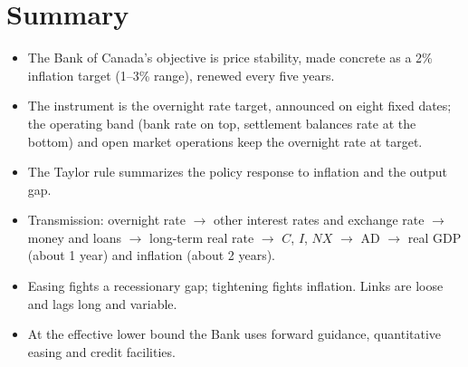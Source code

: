 \section{Summary}

\begin{itemize}
  \item The Bank of Canada's objective is price stability, made concrete as a 2\% inflation
        target (1--3\% range), renewed every five years.
  \item The instrument is the overnight rate target, announced on eight fixed dates; the
        operating band (bank rate on top, settlement balances rate at the bottom) and open
        market operations keep the overnight rate at target.
  \item The Taylor rule summarizes the policy response to inflation and the output gap.
  \item Transmission: overnight rate $\to$ other interest rates and exchange rate $\to$
        money and loans $\to$ long-term real rate $\to$ $C$, $I$, $NX$ $\to$ AD $\to$ real
        GDP (about 1 year) and inflation (about 2 years).
  \item Easing fights a recessionary gap; tightening fights inflation. Links are loose and
        lags long and variable.
  \item At the effective lower bound the Bank uses forward guidance, quantitative easing
        and credit facilities.
\end{itemize}
